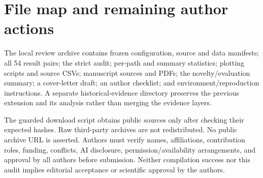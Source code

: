 \documentclass[smallextended]{svjour3}
\begin{document}
\section{File map and remaining author actions}
The local review archive contains frozen configuration, source and data manifests;
all 54 result pairs; the strict audit; per-path and summary statistics; plotting
scripts and source CSVs; manuscript sources and PDFs; the novelty/evaluation
summary; a cover-letter draft; an author checklist; and environment/reproduction
instructions. A separate historical-evidence directory preserves the previous
extension and its analysis rather than merging the evidence layers.

The guarded download script obtains public sources only after checking their
expected hashes. Raw third-party archives are not redistributed. No public
archive URL is asserted. Authors must verify names, affiliations, contribution
roles, funding, conflicts, AI disclosure, permission/availability arrangements,
and approval by all authors before submission. Neither compilation success nor
this audit implies editorial acceptance or scientific approval by the authors.
\end{document}
